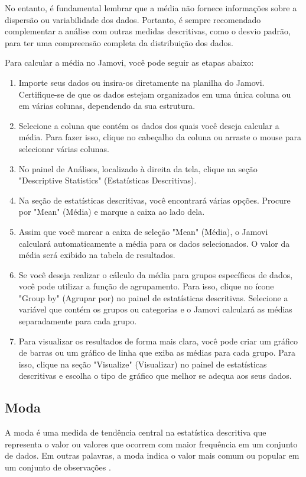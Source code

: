 No entanto, é fundamental lembrar que a média não fornece informações sobre a dispersão ou variabilidade dos dados. Portanto, é sempre recomendado complementar a análise com outras medidas descritivas, como o desvio padrão, para ter uma compreensão completa da distribuição dos dados.

Para calcular a média no Jamovi, você pode seguir as etapas abaixo:

\begin{enumerate}
    \item Importe seus dados ou insira-os diretamente na planilha do Jamovi. Certifique-se de que os dados estejam organizados em uma única coluna ou em várias colunas, dependendo da sua estrutura.
    \item Selecione a coluna que contém os dados dos quais você deseja calcular a média. Para fazer isso, clique no cabeçalho da coluna ou arraste o mouse para selecionar várias colunas.
    \item No painel de Análises, localizado à direita da tela, clique na seção "Descriptive Statistics" (Estatísticas Descritivas).
    \item Na seção de estatísticas descritivas, você encontrará várias opções. Procure por "Mean" (Média) e marque a caixa ao lado dela.
    \item Assim que você marcar a caixa de seleção "Mean" (Média), o Jamovi calculará automaticamente a média para os dados selecionados. O valor da média será exibido na tabela de resultados.
    \item Se você deseja realizar o cálculo da média para grupos específicos de dados, você pode utilizar a função de agrupamento. Para isso, clique no ícone "Group by" (Agrupar por) no painel de estatísticas descritivas. Selecione a variável que contém os grupos ou categorias e o Jamovi calculará as médias separadamente para cada grupo.
    \item Para visualizar os resultados de forma mais clara, você pode criar um gráfico de barras ou um gráfico de linha que exiba as médias para cada grupo. Para isso, clique na seção "Visualize" (Visualizar) no painel de estatísticas descritivas e escolha o tipo de gráfico que melhor se adequa aos seus dados.
\end{enumerate}

\subsection{Moda}

A moda é uma medida de tendência central na estatística descritiva que representa o valor ou valores que ocorrem com maior frequência em um conjunto de dados. Em outras palavras, a moda indica o valor mais comum ou popular em um conjunto de observações \parencite{Triola2017}.

